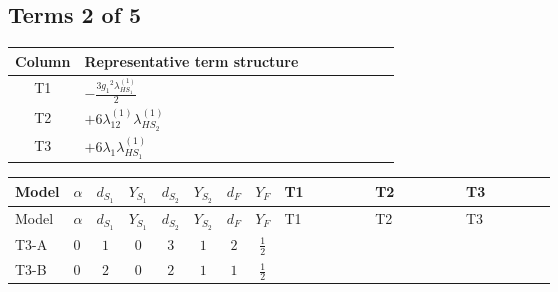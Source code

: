 \documentclass[8pt]{article}
\begin{document}
\begin{landscape}
\subsection*{Terms 2 of 5}
\begin{center}
\begin{tabular}{@{}c >{\raggedright\arraybackslash}p{0.82\linewidth}@{}}
\toprule
Column & Representative term structure \\
\midrule
T1 & \(\displaystyle -\frac{3 {g_1}^2 {\lambda_{HS_1}^{(1)}}}{2}\) \\
\midrule
T2 & \(\displaystyle +6 {\lambda_{12}^{(1)}} {\lambda_{HS_2}^{(1)}}\) \\
\midrule
T3 & \(\displaystyle +6 {\lambda_1} {\lambda_{HS_1}^{(1)}}\) \\
\midrule
\bottomrule
\end{tabular}
\end{center}
\smallskip
\tiny
\begin{longtable}{@{}llcccccc >{\raggedright\arraybackslash}p{0.21\linewidth} >{\raggedright\arraybackslash}p{0.21\linewidth} >{\raggedright\arraybackslash}p{0.21\linewidth}@{}}
\toprule
Model & $\alpha$ & $d_{S_1}$ & $Y_{S_1}$ & $d_{S_2}$ & $Y_{S_2}$ & $d_F$ & $Y_F$ & T1 & T2 & T3 \\
\midrule
\endfirsthead
\toprule
Model & $\alpha$ & $d_{S_1}$ & $Y_{S_1}$ & $d_{S_2}$ & $Y_{S_2}$ & $d_F$ & $Y_F$ & T1 & T2 & T3 \\
\midrule
\endhead
T3-A & $0$ & $1$ & $0$ & $3$ & $1$ & $2$ & $\frac{1}{2}$ & \scriptsize\adjustbox{max width=\linewidth}{$\begin{gathered} -\frac{3 {g_1}^2 {\lambda_{HS_1}^{(1)}}}{2}\end{gathered}$} & \scriptsize\adjustbox{max width=\linewidth}{$\begin{gathered} +6 {\lambda_{12}^{(1)}} {\lambda_{HS_2}^{(1)}}\end{gathered}$} & \scriptsize\adjustbox{max width=\linewidth}{$\begin{gathered} +6 {\lambda_1} {\lambda_{HS_1}^{(1)}}\end{gathered}$} \\
\midrule
T3-B & $0$ & $2$ & $0$ & $2$ & $1$ & $1$ & $\frac{1}{2}$ & \scriptsize\adjustbox{max width=\linewidth}{$\begin{gathered} -\frac{3 {g_1}^2 {\lambda_{HS_1}^{(1)}}}{2}\end{gathered}$} & \scriptsize\adjustbox{max width=\linewidth}{$\begin{gathered} +4 {\lambda_{12}^{(1)}} {\lambda_{HS_2}^{(1)}}\end{gathered}$} & \scriptsize\adjustbox{max width=\linewidth}{$\begin{gathered} +6 {\lambda_1} {\lambda_{HS_1}^{(1)}}\end{gathered}$} \\

\end{longtable}
\end{landscape}
\end{document}
